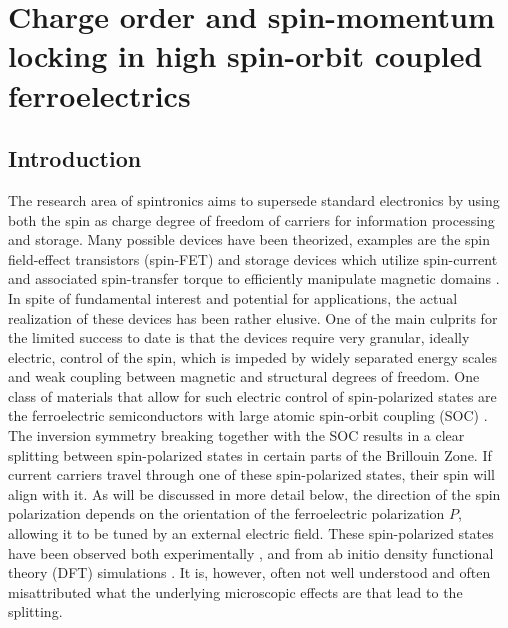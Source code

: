 \chapter{Charge order and spin-momentum locking in high spin-orbit coupled ferroelectrics}
\section{Introduction}
The research area of spintronics aims to supersede standard electronics by using both the spin as charge degree of freedom of carriers for information processing and storage. %
Many possible devices have been theorized, examples are the spin field-effect transistors (spin-FET)\cite{Datta1990} and storage devices which utilize spin-current and associated spin-transfer torque to efficiently manipulate magnetic domains \cite{Kent2015,Jungwirth2016}. In spite of fundamental interest and potential for applications, the actual realization of these devices has been rather elusive.
One of the main culprits for the limited success to date is that the devices require very granular, ideally electric, control of the spin, which is impeded by widely separated energy scales and weak coupling between magnetic and structural degrees of freedom.
One class of materials that allow for such electric control of spin-polarized states are the ferroelectric semiconductors with large atomic spin-orbit coupling (SOC) \cite{DiSante2013,Ishizaka2011,Kim2014}.
The inversion symmetry breaking together with the SOC results in a clear splitting between spin-polarized states in certain parts of the Brillouin Zone. If current carriers travel through one of these spin-polarized states, their spin will align with it. As will be discussed in more detail below, the direction of the spin polarization depends on the orientation of the ferroelectric polarization $P$, allowing it to be tuned by an external electric field. These spin-polarized states have been observed both experimentally \cite{Ishizaka2011,Liebmann2016,Krempasky2015SurfaceSemiconductor}, and from ab initio density functional theory (DFT) simulations \cite{DiSante2013}. It is, however, often not well understood and often misattributed what the underlying microscopic effects are that lead to the splitting.

